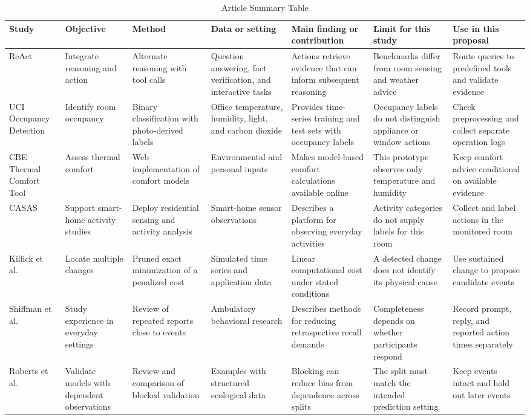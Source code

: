\begin{table}[t]
\caption{Article Summary Table}
\label{tab:literature}
\centering\footnotesize
\setlength{\tabcolsep}{3pt}
\begin{tabular}{@{}p{}p{}p{}p{}p{}p{}p{}@{}}
\hline
Study & Objective & Method & Data or setting & Main finding or contribution & Limit for this study & Use in this proposal \\
\hline
ReAct \cite{yao2023react} &
Integrate reasoning and action &
Alternate reasoning with tool calls &
Question answering, fact verification, and interactive tasks &
Actions retrieve evidence that can inform subsequent reasoning &
Benchmarks differ from room sensing and weather advice &
Route queries to predefined tools and validate evidence \\
UCI Occupancy Detection \cite{uci_occupancy} &
Identify room occupancy &
Binary classification with photo-derived labels &
Office temperature, humidity, light, and carbon dioxide &
Provides time-series training and test sets with occupancy labels &
Occupancy labels do not distinguish appliance or window actions &
Check preprocessing and collect separate operation logs \\
CBE Thermal Comfort Tool \cite{tartarini2020cbe} &
Assess thermal comfort &
Web implementation of comfort models &
Environmental and personal inputs &
Makes model-based comfort calculations available online &
This prototype observes only temperature and humidity &
Keep comfort advice conditional on available evidence \\
CASAS \cite{cook2013casas} &
Support smart-home activity studies &
Deploy residential sensing and activity analysis &
Smart-home sensor observations &
Describes a platform for observing everyday activities &
Activity categories do not supply labels for this room &
Collect and label actions in the monitored room \\
Killick et al.\ \cite{killick2012changepoints} &
Locate multiple changes &
Pruned exact minimization of a penalized cost &
Simulated time series and application data &
Linear computational cost under stated conditions &
A detected change does not identify its physical cause &
Use sustained change to propose candidate events \\
Shiffman et al.\ \cite{shiffman2008ema} &
Study experience in everyday settings &
Review of repeated reports close to events &
Ambulatory behavioral research &
Describes methods for reducing retrospective recall demands &
Completeness depends on whether participants respond &
Record prompt, reply, and reported action times separately \\
Roberts et al.\ \cite{roberts2017cv} &
Validate models with dependent observations &
Review and comparison of blocked validation &
Examples with structured ecological data &
Blocking can reduce bias from dependence across splits &
The split must match the intended prediction setting &
Keep events intact and hold out later events \\
\hline
\end{tabular}
\end{table}
